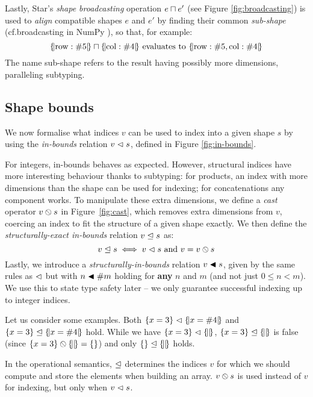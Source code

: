 Lastly, Star's \textit{shape broadcasting}
operation $e \sqcap e'$ (see Figure \ref{fig:broadcasting}) is used to \textit{align} compatible shapes $e$ and $e'$ by finding their common \emph{sub-shape} (cf.\@ broadcasting in NumPy \cite{numpy}), so that, for example:
$$ \sproductval{\mathrm{row}: \ssized 5} \broadcast \sproductval{\mathrm{col}: \ssized 4} \text{ evaluates to } \sproductval{\mathrm{row}: \ssized 5, \mathrm{col}: \ssized 4}$$
The name sub-shape refers to the result having possibly more dimensions, paralleling subtyping.

\subsection{Shape bounds}
\label{subsec:shape-bounds}

We now formalise what indices $v$ can be used to index into a given shape $s$ by using the \emph{in-bounds} relation $v \vartriangleleft s$, defined in Figure \ref{fig:in-bounds}.

For integers, in-bounds behaves as expected. 
However, structural indices have more interesting behaviour thanks to subtyping:
for products, an index with more dimensions than the shape can be used for indexing; for concatenations any component works. 
To manipulate these extra dimensions, we define a \emph{cast} operator ${v} \obslash {s}$ in Figure~\ref{fig:cast}, which removes extra dimensions from $v$, coercing an index to fit the structure of a given shape exactly.
We then define the \emph{structurally-exact in-bounds} relation $v \trianglelefteq s$ as:
$$ v \trianglelefteq s \iff v \vartriangleleft s \text{ and } v = {v} \obslash {s}$$
Lastly, we introduce a \emph{structurally-in-bounds} relation $v \blacktriangleleft s$, given by the same rules as $\vartriangleleft$ but with $n \blacktriangleleft \#{m}$ holding for \textbf{any} $n$ and $m$ (and not just $0 \le n < m$). We use this to state type safety later -- we only guarantee successful indexing up to integer indices.

Let us consider some examples. Both $\srecordval{ x = 3 } \inbs \sproductval{x = \ssize 4}$
and $\srecordval{ x = 3 } \inbsp \sproductval{x = \ssize 4}$ hold.
While we have $\srecordval{x = 3} \inbs \sproductval{}$, $\srecordval{x = 3} \inbsp \sproductval{}$ is false (since $\scast{\srecordval{x = 3}}{\sproductval{}} = \srecordval{}$) and only $\srecordval{} \inbsp \sproductval{}$ holds.

In the operational semantics, $\trianglelefteq$ determines the indices $v$ for which we should compute and store the elements when building an array. ${v} \obslash {s}$ is used instead of $v$ for indexing, but only when $v \vartriangleleft s$.

